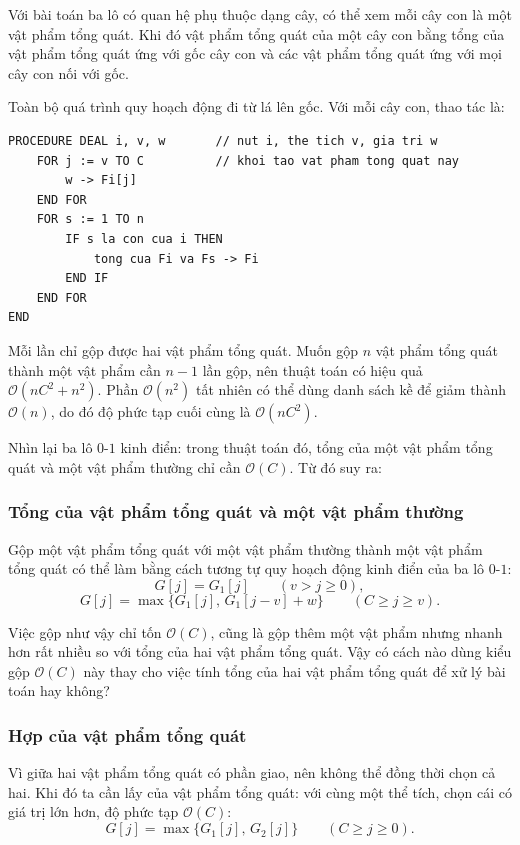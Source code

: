 \documentclass[11pt]{article}
\newcommand{\Oh}{\mathcal{O}}
\begin{document}
Với bài toán ba lô có quan hệ phụ thuộc dạng cây, có thể xem mỗi cây con là
một vật phẩm tổng quát. Khi đó vật phẩm tổng quát của một cây con bằng tổng
của vật phẩm tổng quát ứng với gốc cây con và các vật phẩm tổng quát ứng với
mọi cây con nối với gốc.

Toàn bộ quá trình quy hoạch động đi từ lá lên gốc. Với mỗi cây con, thao tác
là:

\begin{verbatim}
PROCEDURE DEAL i, v, w       // nut i, the tich v, gia tri w
    FOR j := v TO C          // khoi tao vat pham tong quat nay
        w -> Fi[j]
    END FOR
    FOR s := 1 TO n
        IF s la con cua i THEN
            tong cua Fi va Fs -> Fi
        END IF
    END FOR
END
\end{verbatim}

Mỗi lần chỉ gộp được hai vật phẩm tổng quát. Muốn gộp \(n\) vật phẩm tổng quát
thành một vật phẩm cần \(n-1\) lần gộp, nên thuật toán có hiệu quả
\(\Oh(nC^2+n^2)\). Phần \(\Oh(n^2)\) tất nhiên có thể dùng danh sách kề để
giảm thành \(\Oh(n)\), do đó độ phức tạp cuối cùng là \(\Oh(nC^2)\).

Nhìn lại ba lô \(0\)-\(1\) kinh điển: trong thuật toán đó, tổng của một vật
phẩm tổng quát và một vật phẩm thường chỉ cần \(\Oh(C)\). Từ đó suy ra:

\subsubsection*{Tổng của vật phẩm tổng quát và một vật phẩm thường}

Gộp một vật phẩm tổng quát với một vật phẩm thường thành một vật phẩm tổng
quát có thể làm bằng cách tương tự quy hoạch động kinh điển của ba lô
\(0\)-\(1\):
\[
  G[j]=G_1[j]\qquad (v>j\ge 0),
\]
\[
  G[j]=\max\{G_1[j],\,G_1[j-v]+w\}
  \qquad (C\ge j\ge v).
\]

Việc gộp như vậy chỉ tốn \(\Oh(C)\), cũng là gộp thêm một vật phẩm nhưng nhanh
hơn rất nhiều so với tổng của hai vật phẩm tổng quát. Vậy có cách nào dùng
kiểu gộp \(\Oh(C)\) này thay cho việc tính tổng của hai vật phẩm tổng quát để
xử lý bài toán hay không?

\subsubsection*{Hợp của vật phẩm tổng quát}

Vì giữa hai vật phẩm tổng quát có phần giao, nên không thể đồng thời chọn cả
hai. Khi đó ta cần lấy  của vật phẩm tổng quát: với cùng một thể
tích, chọn cái có giá trị lớn hơn, độ phức tạp \(\Oh(C)\):
\[
  G[j]=\max\{G_1[j],\,G_2[j]\}\qquad (C\ge j\ge 0).
\]
\end{document}
